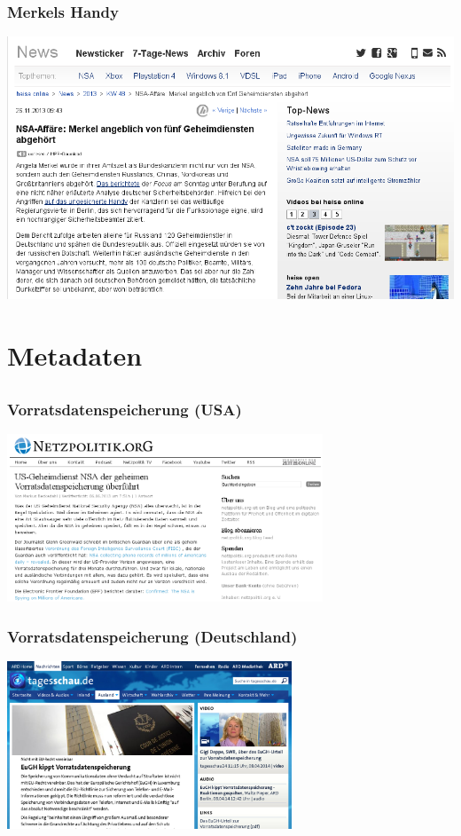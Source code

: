 \documentclass[12pt]{beamer}
\begin{document}
\begin{frame}
    \frametitle{Merkels Handy}
    \includegraphics[height=0.7\textheight]{img/heise-merkel.png}
\end{frame}

\section{Metadaten}
\subsection{}

\begin{frame}
  \frametitle{Vorratsdatenspeicherung (USA)}
    \begin{center}
      \includegraphics[height=5cm]{img/netzpolitik-verizon.png}
    \end{center}
\end{frame}

\begin{frame}
  \frametitle{Vorratsdatenspeicherung (Deutschland)}
    \begin{center}
      \includegraphics[height=5cm]{img/tagesschau-vds.png}
    \end{center}
\end{frame}
\end{document}
